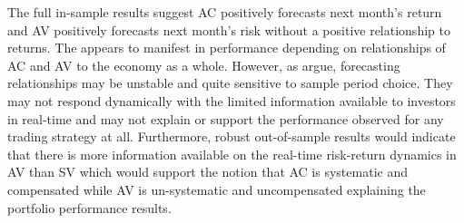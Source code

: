 The full in-sample results suggest AC positively forecasts next month's return and AV positively forecasts next month's risk without a positive relationship to returns. The appears to manifest in performance depending on relationships of AC and AV to the economy as a whole. However, as \citet{Welch2008} argue, forecasting relationships may be unstable and quite sensitive to sample period choice. They may not respond dynamically with the limited information available to investors in real-time and may not explain or support the performance observed for any trading strategy at all. Furthermore, robust out-of-sample results would indicate that there is more information available on the real-time risk-return dynamics in AV than SV which would support the notion that AC is systematic and compensated while AV is un-systematic and uncompensated explaining the portfolio performance results.

